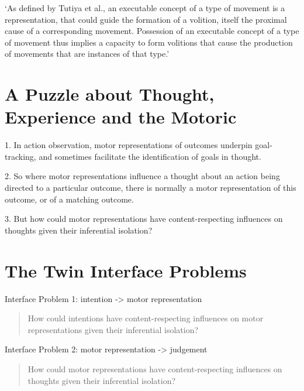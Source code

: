 \documentclass[12pt]{extarticle}
\begin{document}
\begin{multicols*}{3}
‘As defined by Tutiya et al., an executable concept of a type of movement is a
representation, that could guide the formation of a volition, itself the proximal cause of
a corresponding movement. Possession of an executable concept of a type of movement thus
implies a capacity to form volitions that cause the production of movements that are
instances of that type.’
\citep[p.~7]{pacherie:2011_nonconceptual}
 
 
 
\section{A Puzzle about Thought, Experience and the Motoric}

1. In action observation, motor representations of outcomes  underpin goal-tracking, and
sometimes facilitate the identification of goals in thought.

2. So where motor representations influence a thought about an action being directed to a particular outcome, there is normally a motor representation of this outcome, or of a matching outcome.

3. But how could motor representations have content-respecting influences on thoughts given their inferential isolation?
 
  
  \section{The Twin Interface Problems}
 
  Interface Problem 1: intention -> motor representation
  \begin{quote}
  How could intentions have content-respecting influences on motor representations given their inferential isolation?
  \end{quote}
  
  Interface Problem 2: motor representation -> judgement
  
  
  \begin{quote}
    How could motor representations have content-respecting influences on thoughts given their inferential isolation?
    \end{quote}

\vfill
 


\footnotesize


\end{multicols*}
\end{document}
